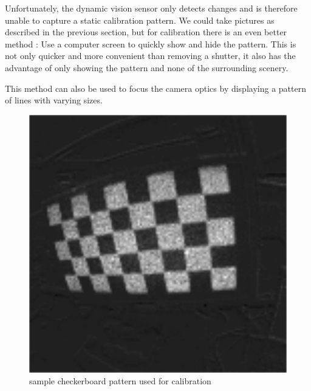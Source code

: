 Unfortunately, the dynamic vision sensor only detects changes and is therefore unable to
capture a static calibration pattern. We could take pictures as described in
the previous section, but for calibration there is an even better method \cite{mueggler2014event}: Use a
computer screen to quickly show and hide the pattern. This is not only quicker
and more convenient than removing a shutter, it also has the advantage of only
showing the pattern and none of the surrounding scenery.

This method can also be used to focus the camera optics by displaying a pattern
of lines with varying sizes.

\begin{figure}
\includegraphics[width=\linewidth]{images/checkerboard_integrated.png}
\caption{sample checkerboard pattern used for calibration}
\label{fig:calibration}
\end{figure}
